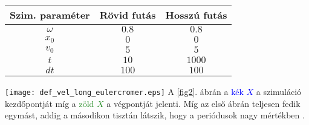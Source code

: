 \begin{multicols}{2}
\begin{center}
\begin{tabular}{c|c|c}
Szim. paraméter & Rövid futás & Hosszú futás \\
\hline \hline
$\omega$ & $0.8$ & $0.8$ \\
\hline
$x_{0}$ & $0$ & $0$ \\
\hline
$v_{0}$ & $5$ & $5$ \\
\hline
$t$ & $10$ & $1000$ \\
\hline
$dt$ & $100$ & $100$ \\
\hline
\end{tabular}
\end{center}
\label{tab3}
\hfill \break \hfill \break
{\centering\texttt{[image: def\_vel\_long\_eulercromer.eps]}}
\label{fig2}
\hfill \break \hfill \break
A \ref{fig2}. ábrán a \textcolor{blue}{kék $X$} a szimuláció kezdőpontját míg a \textcolor{ForestGreen}{zöld $X$} a végpontját jelenti. Míg az első ábrán teljesen fedik egymást, addig a másodikon tisztán látszik, hogy a periódusok nagy mértékben .


\end{multicols}
